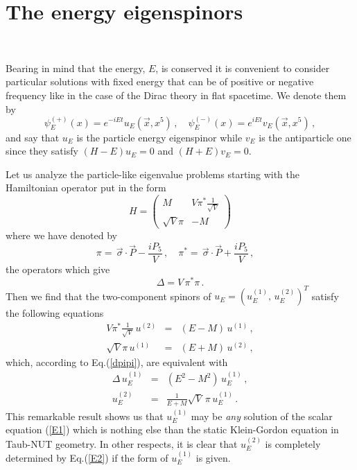 \documentclass[a4paper,12pt]{article}
\begin{document}
\section{The energy eigenspinors}
\

Bearing in mind that the energy, $E$, is conserved it is convenient to 
consider particular solutions with fixed energy that can be of positive or 
negative frequency like in the case of the Dirac theory in flat spacetime. 
We denote them by
\begin{equation}
\psi_{E}^{(+)}(x)=e^{-iEt}u_{E}(\vec{x},x^{5})\,,\quad  
\psi_{E}^{(-)}(x)=e^{iEt}v_{E}(\vec{x},x^{5})\,,  
\end{equation}
and say that $u_{E}$ is the particle energy eigenspinor while $v_{E}$ is 
the antiparticle one since they satisfy $(H-E)u_{E}=0$ and $(H+E)v_{E}=0$.   

Let us analyze the particle-like eigenvalue problems  starting 
with the Hamiltonian operator put in the form 
\begin{equation}\label{HH}
H =\left(
\begin{array}{cc}
M&V\pi^{*}\frac{\textstyle 1}{\textstyle \sqrt{V}}\\
\sqrt{V}\pi&-M
\end{array}\right)
\end{equation}
where we have denoted by
\begin{equation}
\pi=\,\vec{\sigma}\cdot\vec{P}-\frac{iP_{5}}{V}\,,\quad 
\pi^{*}=\,\vec{\sigma}\cdot\vec{P}+\frac{iP_{5}}{V}\,,\quad 
\end{equation}
the operators which give 
\begin{equation}\label{dpipi}
\Delta=V\,\pi^{*}\pi\,.
\end{equation}
Then we find that the  two-component spinors of 
$u_{E}=(u^{(1)}_{E},\,u^{(2)}_{E})^{T}$ satisfy
the following  equations
\begin{eqnarray}
V\pi^{*}\frac{1}{\sqrt{V}}\,u^{(2)}&=&(E-M)\,u^{(1)}\,,\label{E10}\\
\sqrt{V}\pi\,u^{(1)}&=&(E+M)\,u^{(2)}\,,\label{E20}
\end{eqnarray}
which, according to Eq.(\ref{dpipi}), are equivalent with
\begin{eqnarray}
\Delta\, u_{E}^{(1)}&=&(E^{2}-M^{2})\,u_{E}^{(1)}\,,\label{E1}\\
u^{(2)}_{E}&=&\frac{1}{E+M}\sqrt{V}\,\pi\,u^{(1)}_{E}\,.\label{E2}
\end{eqnarray}
This  remarkable result shows us that $u_{E}^{(1)}$ may be {\em any} solution 
of the scalar equation (\ref{E1}) which is nothing else than the static 
Klein-Gordon equation in  Taub-NUT geometry. In other respects,   
it is clear that $u^{(2)}_{E}$ is completely determined by Eq.(\ref{E2}) 
if the form of $u^{(1)}_{E}$ is given. 
\end{document}
